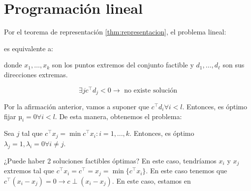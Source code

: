 \section{Programación lineal}

Por el teorema de representación \ref{thm:representacion}, el problema lineal:


\begin{ioprob}
\end{ioprob}

es equivalente a:

\begin{ioprob}
\end{ioprob}

donde $x_1,\ldots, x_k$ son los puntos extremos del conjunto factible y  $d_1,\ldots,d_\ell$ son sus direcciones extremas.



\[\exists j c^\top d_j < 0 \to \text{ no existe solución}\]

Por la afirmación anterior, vamos a suponer que $c^\top d_i ∀i < l$. Entonces, es óptimo fijar $µ_i = 0∀i<l$. De esta manera, obtenemos el problema:
\begin{ioprob}
\end{ioprob}

Sea $j$ tal que $c^\top x_j = \min{c^\top x_i : i = 1,..., k}$. Entonces, es óptimo $λ_j = 1, λ_i = 0 ∀i≠j$.


\begin{figure}[h]
\centering
{}
\end{figure}


¿Puede haber 2 soluciones factibles óptimas? En este caso, tendríamos $x_i$ y $x_j$ extremos tal que $c^\top x_i = c^\top = x_j = \min\{c^\top x_i \}$. En este caso tenemos que $c^\top(x_i - x_j) = 0 \to c\perp (x_i-x_j)$. En este caso, estamos en


